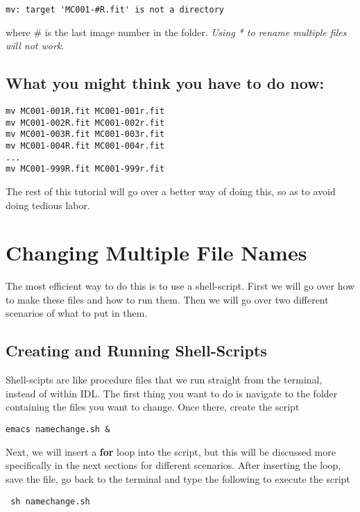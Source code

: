 \documentclass[10pt,preprint]{aastex}
\begin{document}
\begin{verbatim}
mv: target 'MC001-#R.fit' is not a directory
\end{verbatim}

where \#{} is the last image number in the folder.  \emph{Using * to rename multiple files will not work}.  

\subsection{What you might think you have to do now:}

\begin{verbatim}
mv MC001-001R.fit MC001-001r.fit
mv MC001-002R.fit MC001-002r.fit
mv MC001-003R.fit MC001-003r.fit
mv MC001-004R.fit MC001-004r.fit
...
mv MC001-999R.fit MC001-999r.fit
\end{verbatim}

The rest of this tutorial will go over a better way of doing this, so as to avoid doing tedious labor.

\section{Changing Multiple File Names}

The most efficient way to do this is to use a shell-script.  First we will go over how to make these files and how to run them.  Then we will go over two different scenarios of what to put in them.

\subsection{Creating and Running Shell-Scripts}
Shell-scipts are like procedure files that we run straight from the terminal, instead of within IDL.  The first thing you want to do is navigate to the folder containing the files you want to change.  Once there, create the script

\begin{verbatim}
emacs namechange.sh &
\end{verbatim}

Next, we will insert a \textbf{for} loop into the script, but this will be discussed more specifically in the next sections for different scenarios.  After inserting the loop, save the file, go back to the terminal and type the following to execute the script

\begin{verbatim}
 sh namechange.sh
\end{verbatim}
\end{document}
